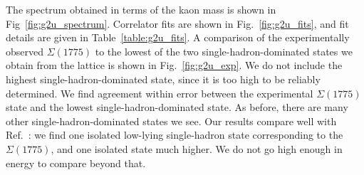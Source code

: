 The spectrum obtained in terms of the kaon mass is shown in Fig~\ref{fig:g2u_spectrum}. Correlator fits are shown in Fig.~\ref{fig:g2u_fits}, and fit details are given in Table~\ref{table:g2u_fits}. A comparison of the experimentally observed $\Sigma(1775)$ to the lowest of the two single-hadron-dominated states we obtain from the lattice is shown in Fig.~\ref{fig:g2u_exp}. We do not include the highest single-hadron-dominated state, since it is too high to be reliably determined. We find agreement within error between the experimental $\Sigma(1775)$ state and the lowest single-hadron-dominated state. As before, there are many other single-hadron-dominated states we see. Our results compare well with Ref.~\cite{Edwards:2012fx}: we find one isolated low-lying single-hadron state corresponding to the $\Sigma(1775)$, and one isolated state much higher. We do not go high enough in energy to compare beyond that.
\renewcommand{\arraystretch}{1.4}
